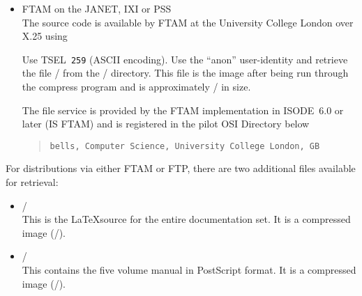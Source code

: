 \begin{itemize}
\item	FTAM on the JANET, IXI or PSS\\
The source code is available by FTAM at the University College London
over X.25 using 
Use TSEL~\verb"259" (ASCII encoding).
Use the ``anon'' user-identity and retrieve the file 
\compressfile/ from the \uktarplace/ directory.
This file is the  image after being run through the compress program
and is approximately \compressize/ in size.

The file service is provided by the FTAM implementation in ISODE~6.0 or later
(IS FTAM) and is registered in the pilot OSI Directory below
\begin{quote}\footnotesize\begin{verbatim}
bells, Computer Science, University College London, GB
\end{verbatim}\end{quote}



\end{itemize}

For distributions via either FTAM or FTP, there are two additional files
available for retrieval:

\begin{itemize}

\item  \Docfile/\\
This is the \LaTeX source for the entire documentation set.
It is a compressed  image (\DocSize/).

\item  \PSfile/\\
This contains the five volume manual in PostScript format.
It is a compressed  image (\PSsize/).

\end{itemize}




